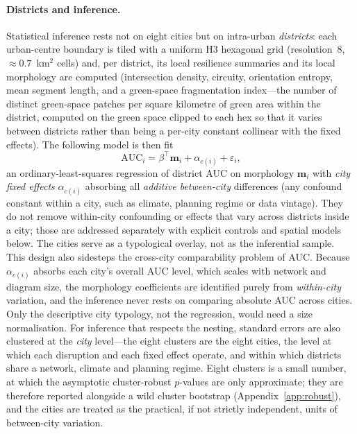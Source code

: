 \paragraph{Districts and inference.} Statistical inference rests not on eight
cities but on intra-urban \emph{districts}: each urban-centre boundary is tiled
with a uniform H3 hexagonal grid (resolution~8, $\approx0.7$~km$^2$ cells) and,
per district, its local resilience summaries and its local morphology are computed
(intersection density, circuity, orientation entropy, mean segment length, and a
green-space fragmentation index---the number of distinct green-space patches per
square kilometre of green area within the district, computed on the green space
clipped to each hex so that it varies between districts rather than being a
per-city constant collinear with the fixed effects). The following model is then fit
\[
\mathrm{AUC}_i = \beta^\top \mathbf{m}_i + \alpha_{c(i)} + \varepsilon_i,
\]
an ordinary-least-squares regression of district AUC on morphology
$\mathbf{m}_i$ with \emph{city fixed effects} $\alpha_{c(i)}$ absorbing all
\emph{additive between-city} differences (any confound constant within a city, such
as climate, planning regime or data vintage). They do not remove within-city
confounding or effects that vary across districts inside a city; those are addressed
separately with explicit controls and spatial models below. The cities serve
as a typological overlay, not as the inferential sample. This design also sidesteps the cross-city comparability
problem of AUC. Because $\alpha_{c(i)}$ absorbs each city's overall AUC level, which
scales with network and diagram size, the morphology coefficients are identified
purely from \emph{within-city} variation, and the inference never rests on comparing
absolute AUC across cities. Only the descriptive city typology, not the regression,
would need a size normalisation. For inference that respects the nesting, standard
errors are also clustered at the \emph{city} level---the eight clusters are the eight
cities, the level at which each disruption and each fixed effect operate, and within
which districts share a network, climate and planning regime. Eight clusters is a
small number, at which the asymptotic cluster-robust $p$-values are only approximate;
they are therefore reported alongside a wild cluster bootstrap
(Appendix~\ref{app:robust}), and the cities are treated as the practical, if not
strictly independent, units of between-city variation.

